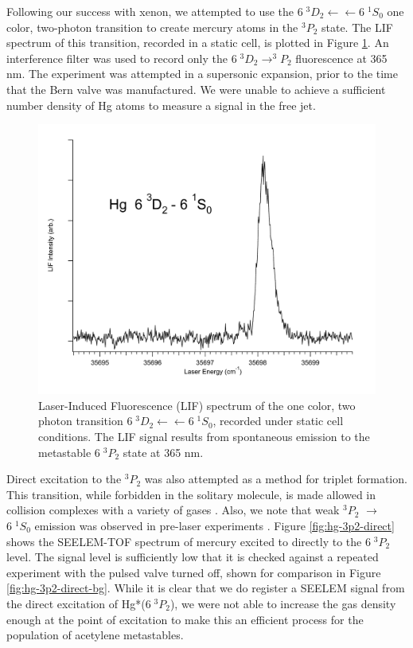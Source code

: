 Following our success with xenon, we attempted to use the $6\;^3D_2
\leftarrow \leftarrow 6\;^1S_0$ one color, two-photon transition to
create mercury atoms in the $^3P_2$ state.  The LIF spectrum of this
transition, recorded in a static cell, is plotted in Figure
\ref{fig:hg3d2-cell}.  An interference filter was used to record only
the $6 \; ^3D_2 \rightarrow ^3P_2$ fluorescence at 365 nm.  The
experiment was attempted in a supersonic expansion, prior to the time
that the Bern valve was manufactured.  We were unable to achieve a
sufficient number density of Hg atoms to measure a signal in the free
jet.

\begin{figure}
  \caption{Laser-Induced Fluorescence (LIF) spectrum of the one color,
    two photon transition  $6\;^3D_2 \leftarrow \leftarrow
    6\;^1S_0$, recorded under static cell conditions.  The LIF signal
    results from spontaneous emission to the metastable $6\;^3P_2$
    state at 365 nm.}
  \label{fig:hg3d2-cell}
  \centering
  \vspace{1cm}
  \includegraphics[width=6in]{Hg3D2-cell.pdf}
  \vspace{1cm}
\end{figure}

Direct excitation to the $^3P_2$ was also attempted as a method for
triplet formation.  This transition, while forbidden in the solitary
molecule, is made allowed in collision complexes with a variety of
gases \cite{kurosawa98, amano98}.  Also, we note that weak $^3P_2$
$\rightarrow$ $6 \; ^1S_0$ emission was observed in pre-laser
experiments \cite{mrozowski45}.  Figure \ref{fig:hg-3p2-direct} shows
the SEELEM-TOF spectrum of mercury excited to directly to the $6 \;
^3P_2$ level.  The signal level is sufficiently low that it is checked
against a repeated experiment with the pulsed valve turned off, shown
for comparison in Figure \ref{fig:hg-3p2-direct-bg}.  While it is
clear that we do register a SEELEM signal from the direct excitation
of Hg*($6 \; ^3P_2$), we were not able to increase the gas density
enough at the point of excitation to make this an efficient process
for the population of acetylene metastables.

